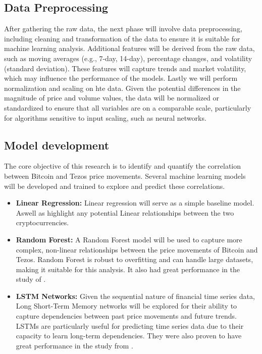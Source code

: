 \subsection{Data Preprocessing}

After gathering the raw data, the next phase will involve data preprocessing, including cleaning and transformation of the data to ensure it is suitable for machine learning analysis.
Additional features will be derived from the raw data, such as moving averages (e.g., 7-day, 14-day), percentage changes, and volatility (standard deviation). These features will capture trends and market volatility, which may influence the performance of the models.
Lastly we will perform normalization and scaling on hte data. Given the potential differences in the magnitude of price and volume values, the data will be normalized or standardized to ensure that all variables are on a comparable scale, particularly for algorithms sensitive to input scaling, such as neural networks.

\subsection{Model development}
The core objective of this research is to identify and quantify the correlation between Bitcoin and Tezos price movements. Several machine learning models will be developed and trained to explore and predict these correlations.
\begin{itemize}
  \item \textbf{Linear Regression:} Linear regression will serve as a simple baseline model. Aswell as highlight any potential Linear relationships between the two cryptocurrencies.
  \item \textbf{Random Forest:} A Random Forest model will be used to capture more complex, non-linear relationships between the price movements of Bitcoin and Tezos. Random Forest is robust to overfitting and can handle large datasets, making it suitable for this analysis. It also had great performance in the study of \textcite{akyildirim2021prediction}.
  \item \textbf{LSTM Networks:} Given the sequential nature of financial time series data, Long Short-Term Memory networks will be explored for their ability to capture dependencies between past price movements and future trends. LSTMs are particularly useful for predicting time series data due to their capacity to learn long-term dependencies. They were also proven to have great performance in the study from \textcite{alessandretti2018anticipating}.
\end{itemize}

